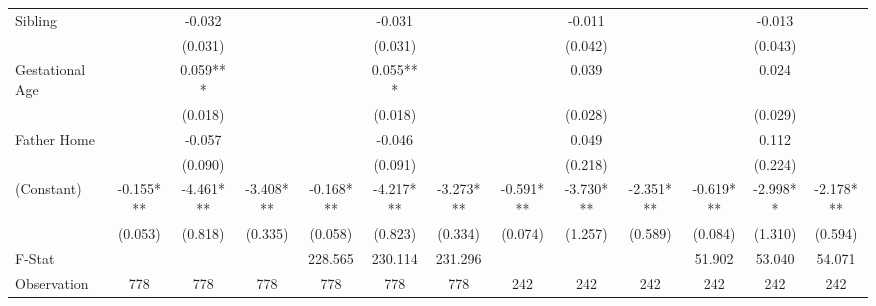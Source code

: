 \begin{tabular}{lcccccccccccc}
Sibling &  & -0.032 &  &  & -0.031 &  &  & -0.011 &  &  & -0.013 &  \\
 &  & (0.031) &  &  & (0.031) &  &  & (0.042) &  &  & (0.043) &  \\
Gestational Age &  & 0.059*** &  &  & 0.055*** &  &  & 0.039 &  &  & 0.024 &  \\
 &  & (0.018) &  &  & (0.018) &  &  & (0.028) &  &  & (0.029) &  \\
Father Home &  & -0.057 &  &  & -0.046 &  &  & 0.049 &  &  & 0.112 &  \\
 &  & (0.090) &  &  & (0.091) &  &  & (0.218) &  &  & (0.224) &  \\
(Constant) & -0.155*** & -4.461*** & -3.408*** & -0.168*** & -4.217*** & -3.273*** & -0.591*** & -3.730*** & -2.351*** & -0.619*** & -2.998** & -2.178*** \\
 & (0.053) & (0.818) & (0.335) & (0.058) & (0.823) & (0.334) & (0.074) & (1.257) & (0.589) & (0.084) & (1.310) & (0.594) \\
\midrule 
F-Stat &  &  &  & 228.565 & 230.114 & 231.296 &  &  &  & 51.902 & 53.040 & 54.071 \\
Observation & 778 & 778 & 778 & 778 & 778 & 778 & 242 & 242 & 242 & 242 & 242 & 242 \\
\midrule 
\bottomrule 
\end{tabular}
